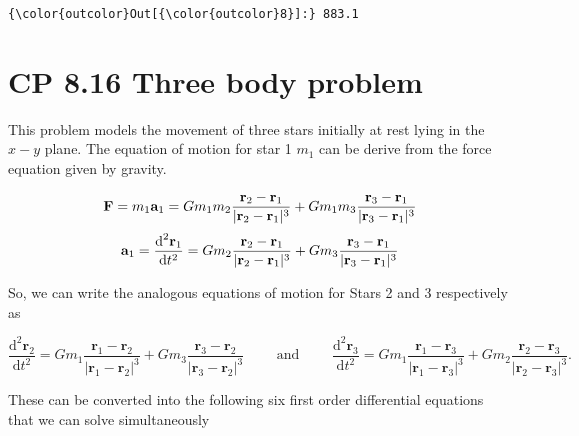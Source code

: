 \documentclass[11pt]{article}
\begin{document}
\begin{Verbatim}[commandchars=\\\{\}]
{\color{outcolor}Out[{\color{outcolor}8}]:} 883.1
\end{Verbatim}
            
    \section{CP 8.16 Three body problem}\label{cp-8.16-three-body-problem}

This problem models the movement of three stars initially at rest lying
in the \(x-y\) plane. The equation of motion for star 1 \(m_1\) can be
derive from the force equation given by gravity.

\begin{equation*}
\mathbf{F} = m_1\mathbf{a}_1 = Gm_1m_2\frac{\mathbf{r}_2 - \mathbf{r}_1}{|\mathbf{r}_2 - \mathbf{r}_1|^3} + Gm_1m_3\frac{\mathbf{r}_3 - \mathbf{r}_1}{|\mathbf{r}_3 - \mathbf{r}_1|^3}\\
\end{equation*}
\begin{equation}
\mathbf{a}_1 = \frac{\text{d}^2\mathbf{r}_1}{\text{d}t^2} = Gm_2\frac{\mathbf{r}_2 - \mathbf{r}_1}{|\mathbf{r}_2 - \mathbf{r}_1|^3} + Gm_3\frac{\mathbf{r}_3 - \mathbf{r}_1}{|\mathbf{r}_3 - \mathbf{r}_1|^3}\\
\end{equation}

So, we can write the analogous equations of motion for Stars 2 and 3
respectively as

\[\frac{\text{d}^2\mathbf{r}_2}{\text{d}t^2} = Gm_1\frac{\mathbf{r}_1 - \mathbf{r}_2}{|\mathbf{r}_1 - \mathbf{r}_2|^3} + Gm_3\frac{\mathbf{r}_3 - \mathbf{r}_2}{|\mathbf{r}_3 - \mathbf{r}_2|^3} \qquad \text{ and } \qquad \frac{\text{d}^2\mathbf{r}_3}{\text{d}t^2} = Gm_1\frac{\mathbf{r}_1 - \mathbf{r}_3}{|\mathbf{r}_1 - \mathbf{r}_3|^3} + Gm_2\frac{\mathbf{r}_2 - \mathbf{r}_3}{|\mathbf{r}_2 - \mathbf{r}_3|^3}.\]

These can be converted into the following six first order differential
equations that we can solve simultaneously
\end{document}
